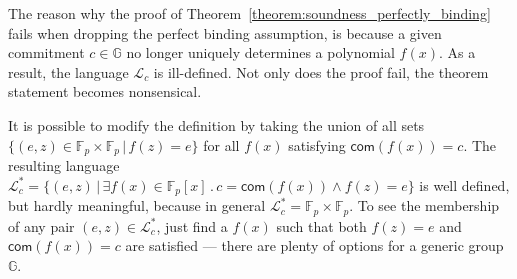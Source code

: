 \documentclass[10pt]{llncs}
\begin{document}
The reason why the proof of Theorem~\ref{theorem:soundness_perfectly_binding} fails when dropping the perfect binding assumption, is because a given commitment $c \in \mathbb{G}$ no longer uniquely determines a polynomial $f(x)$. As a result, the language $\mathcal{L}_c$ is ill-defined. Not only does the proof fail, the theorem statement becomes nonsensical.

It is possible to modify the definition by taking the union of all sets $\{(e, z) \in \mathbb{F}_p \times \mathbb{F}_p \, | \, f(z) = e \}$ for all $f(x)$ satisfying $\mathsf{com}(f(x)) = c$. The resulting language $\mathcal{L}_c^* = \{(e, z) \, | \, \exists f(x) \in \mathbb{F}_p[x] \, . \, c = \mathsf{com}(f(x)) \wedge f(z) = e \}$ is well defined, but hardly meaningful, because in general $\mathcal{L}_c^* = \mathbb{F}_p \times \mathbb{F}_p$. To see the membership of any pair $(e, z) \in \mathcal{L}_c^*$, just find a $f(x)$ such that both $f(z)=e$ and $\mathsf{com}(f(x)) = c$ are satisfied --- there are plenty of options for a generic group $\mathbb{G}$.

\end{document}
